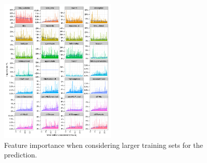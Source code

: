 \begin{figure}[htbp]
	\centering
		\includegraphics[width=0.5\textwidth]{figures/importances}
	\caption{Feature importance when considering larger training sets for the prediction.}
	\label{fig:falsepred}
\end{figure}
